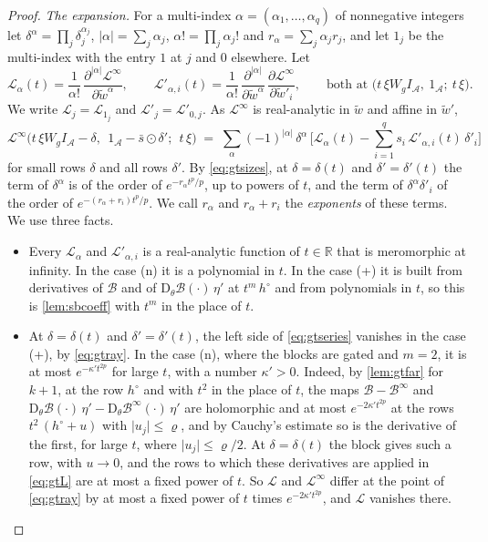 \documentclass[10pt]{article}
\theoremstyle{definition}
\theoremstyle{remark}
\newcommand{\R}{\mathbb{R}}
\newcommand{\Der}{\mathrm{D}}
\begin{document}
\begin{proof}
\emph{The expansion.} For a multi-index $\alpha = (\alpha_1, \dots, \alpha_q)$ of nonnegative integers let $\delta^\alpha = \prod_j\delta_j^{\alpha_j}$, $\lvert\alpha\rvert = \sum_j\alpha_j$, $\alpha! = \prod_j\alpha_j!$ and $r_\alpha = \sum_j\alpha_jr_j$, and let $1_j$ be the multi-index with the entry $1$ at $j$ and $0$ elsewhere. Let
\[
\mathcal L_\alpha(t) = \frac{1}{\alpha!}\,\frac{\partial^{\lvert\alpha\rvert}\mathcal L^\infty}{\partial\tilde w^\alpha}, \qquad \mathcal L'_{\alpha,i}(t) = \frac{1}{\alpha!}\,\frac{\partial^{\lvert\alpha\rvert}}{\partial\tilde w^\alpha}\,\frac{\partial\mathcal L^\infty}{\partial\tilde w'_i}, \qquad\text{both at } \big(t\,\xi W_gI_{\mathcal A},\ 1_{\mathcal A};\ t\,\xi\big).
\]
We write $\mathcal L_j = \mathcal L_{1_j}$ and $\mathcal L'_j = \mathcal L'_{0,j}$. As $\mathcal L^\infty$ is real-analytic in $\tilde w$ and affine in $\tilde w'$,
\begin{equation}\label{eq:gtseries}
\mathcal L^\infty\big(t\,\xi W_gI_{\mathcal A} - \delta,\ \ 1_{\mathcal A} - \bar s\odot\delta';\ \ t\,\xi\big) \;=\; \sum_\alpha(-1)^{\lvert\alpha\rvert}\,\delta^\alpha\,\Big[\mathcal L_\alpha(t) - \sum_{i=1}^{q}s_i\,\mathcal L'_{\alpha,i}(t)\,\delta'_i\Big]
\end{equation}
for small rows $\delta$ and all rows $\delta'$. By \eqref{eq:gtsizes}, at $\delta = \delta(t)$ and $\delta' = \delta'(t)$ the term of $\delta^\alpha$ is of the order of $e^{-r_\alpha t^p/p}$, up to powers of $t$, and the term of $\delta^\alpha\delta'_i$ of the order of $e^{-(r_\alpha + r_i)t^p/p}$. We call $r_\alpha$ and $r_\alpha + r_i$ the \emph{exponents} of these terms. We use three facts.
\begin{itemize}[leftmargin=2.2em]
\item[(a)] Every $\mathcal L_\alpha$ and $\mathcal L'_{\alpha,i}$ is a real-analytic function of $t \in \R$ that is meromorphic at infinity. In the case (n) it is a polynomial in $t$. In the case (+) it is built from derivatives of $\mathcal B$ and of $\Der_\theta\mathcal B(\cdot)\,\eta'$ at $t^m\,h^\circ$ and from polynomials in $t$, so this is \cref{lem:sbcoeff} with $t^m$ in the place of $t$.
\item[(b)] At $\delta = \delta(t)$ and $\delta' = \delta'(t)$, the left side of \eqref{eq:gtseries} vanishes in the case (+), by \eqref{eq:gtray}. In the case (n), where the blocks are gated and $m = 2$, it is at most $e^{-\kappa' t^{2p}}$ for large $t$, with a number $\kappa' > 0$. Indeed, by \cref{lem:gtfar} for $k+1$, at the row $h^\circ$ and with $t^2$ in the place of $t$, the maps $\mathcal B - \mathcal B^\infty$ and $\Der_\theta\mathcal B(\cdot)\,\eta' - \Der_\theta\mathcal B^\infty(\cdot)\,\eta'$ are holomorphic and at most $e^{-2\kappa' t^{2p}}$ at the rows $t^2\,(h^\circ + u)$ with $\lvert u_j\rvert \le \varrho$, and by Cauchy's estimate so is the derivative of the first, for large $t$, where $\lvert u_j\rvert \le \varrho/2$. At $\delta = \delta(t)$ the block gives such a row, with $u \to 0$, and the rows to which these derivatives are applied in \eqref{eq:gtL} are at most a fixed power of $t$. So $\mathcal L$ and $\mathcal L^\infty$ differ at the point of \eqref{eq:gtray} by at most a fixed power of $t$ times $e^{-2\kappa' t^{2p}}$, and $\mathcal L$ vanishes there.

\end{itemize}
\end{proof}
\end{document}
